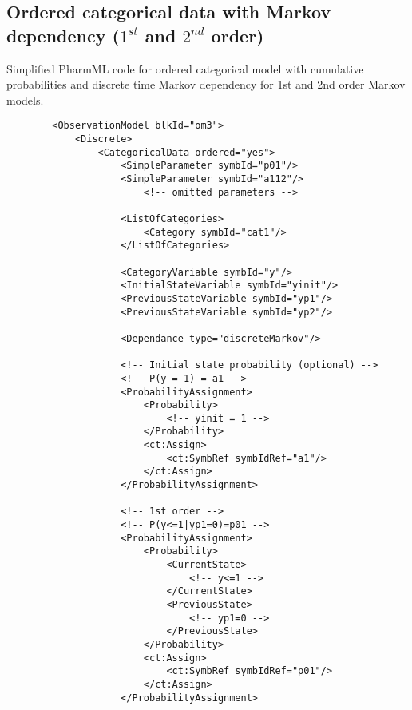 \subsection{Ordered categorical data with Markov dependency ($1^{st}$ and $2^{nd}$ order)}
Simplified PharmML code for ordered categorical model with cumulative probabilities 
and discrete time Markov dependency for 1st and 2nd order Markov models.
\lstset{language=XML}
\begin{lstlisting}
        <ObservationModel blkId="om3">
            <Discrete>
                <CategoricalData ordered="yes">
                    <SimpleParameter symbId="p01"/>
                    <SimpleParameter symbId="a112"/>
                        <!-- omitted parameters -->
                    
                    <ListOfCategories>
                        <Category symbId="cat1"/>
                    </ListOfCategories>
                    
                    <CategoryVariable symbId="y"/>
                    <InitialStateVariable symbId="yinit"/>
                    <PreviousStateVariable symbId="yp1"/>
                    <PreviousStateVariable symbId="yp2"/>
                    
                    <Dependance type="discreteMarkov"/>
                    
                    <!-- Initial state probability (optional) -->
                    <!-- P(y = 1) = a1 -->
                    <ProbabilityAssignment>
                        <Probability>
                            <!-- yinit = 1 -->
                        </Probability>
                        <ct:Assign>
                            <ct:SymbRef symbIdRef="a1"/>
                        </ct:Assign>
                    </ProbabilityAssignment>
                    
                    <!-- 1st order -->
                    <!-- P(y<=1|yp1=0)=p01 -->
                    <ProbabilityAssignment>
                        <Probability>
                            <CurrentState>
                                <!-- y<=1 -->
                            </CurrentState>
                            <PreviousState>
                                <!-- yp1=0 -->
                            </PreviousState>
                        </Probability>
                        <ct:Assign>
                            <ct:SymbRef symbIdRef="p01"/>
                        </ct:Assign>
                    </ProbabilityAssignment>
                    

\end{lstlisting}
